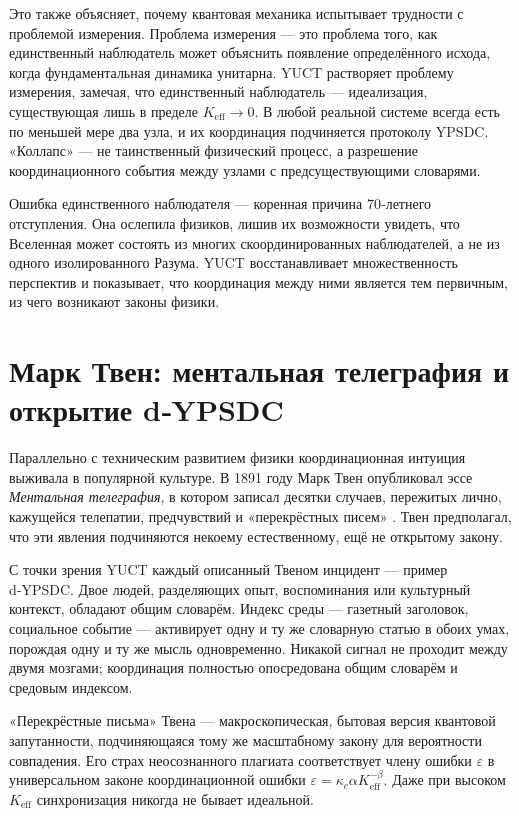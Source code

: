 \documentclass[12pt,a4paper]{article}
\begin{document}
	Это также объясняет, почему квантовая механика испытывает трудности с проблемой измерения. Проблема измерения — это проблема того, как единственный наблюдатель может объяснить появление определённого исхода, когда фундаментальная динамика унитарна. YUCT растворяет проблему измерения, замечая, что единственный наблюдатель — идеализация, существующая лишь в пределе \(K_{\mathrm{eff}} \to 0\). В любой реальной системе всегда есть по меньшей мере два узла, и их координация подчиняется протоколу YPSDC. «Коллапс» — не таинственный физический процесс, а разрешение координационного события между узлами с предсуществующими словарями.
	
	Ошибка единственного наблюдателя — коренная причина 70‑летнего отступления. Она ослепила физиков, лишив их возможности увидеть, что Вселенная может состоять из многих скоординированных наблюдателей, а не из одного изолированного Разума. YUCT восстанавливает множественность перспектив и показывает, что координация между ними является тем первичным, из чего возникают законы физики.
	
	\section{Марк Твен: ментальная телеграфия и открытие d‑YPSDC}
	
	Параллельно с техническим развитием физики координационная интуиция выживала в популярной культуре. В 1891 году Марк Твен опубликовал эссе \emph{Ментальная телеграфия}, в котором записал десятки случаев, пережитых лично, кажущейся телепатии, предчувствий и «перекрёстных писем» \cite{Twain1891}. Твен предполагал, что эти явления подчиняются некоему естественному, ещё не открытому закону.
	
	С точки зрения YUCT каждый описанный Твеном инцидент — пример d‑YPSDC. Двое людей, разделяющих опыт, воспоминания или культурный контекст, обладают общим словарём. Индекс среды — газетный заголовок, социальное событие — активирует одну и ту же словарную статью в обоих умах, порождая одну и ту же мысль одновременно. Никакой сигнал не проходит между двумя мозгами; координация полностью опосредована общим словарём и средовым индексом.
	
	«Перекрёстные письма» Твена — макроскопическая, бытовая версия квантовой запутанности, подчиняющаяся тому же масштабному закону для вероятности совпадения. Его страх неосознанного плагиата соответствует члену ошибки \(\varepsilon\) в универсальном законе координационной ошибки \(\varepsilon = \kappa_c \alpha K_{\mathrm{eff}}^{-\beta}\). Даже при высоком \(K_{\mathrm{eff}}\) синхронизация никогда не бывает идеальной.
	
\end{document}
